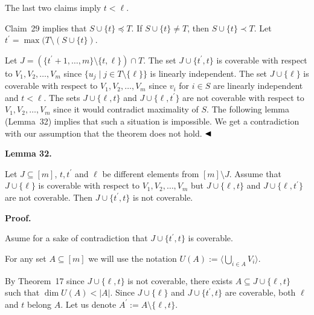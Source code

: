 \documentclass[10pt,a4paper]{article}
\begin{document}
The last two claims imply $t<\ell$.\par



Claim 29 implies that $S\cup\{t\}\preceq T$. If $S\cup\{t\}\neq T$, then $S\cup\{t\}\prec T$.
Let $t^{\prime}=\max(T\setminus(S\cup\{t\})$.\par



Let $J=(\{t^{\prime}+1,\dots,m\}\setminus\{t,\ell\})\cap T$.
The set $J\cup\{t^{\prime},t\}$ is coverable with respect to $V_{1},V_{2},\dots,V_{m}$ since $\{u_{j}\mid j\in T\setminus\{\ell\}\}$ is linearly independent.
The set $J\cup\{\ell\}$ is coverable with respect to $V_{1},V_{2},\dots,V_{m}$ since $v_{i}$ for $i\in S$ are linearly independent and $t<\ell$.
The sets $J\cup\{\ell,t\}$ and $J\cup\{\ell,t^{\prime}\}$ are not coverable with respect to $V_{1},V_{2},\dots,V_{m}$ since it would contradict maximality of $S$. The following lemma (Lemma 32) implies that such a situation is impossible. We get a contradiction with our assumption that the theorem does not hold.
$\hfill\blacktriangleleft$\par



\par\medskip\noindent\textbf{
Lemma 32.
}\par



Let $J\subseteq[m]$, $t,t^{\prime}$ and $\ell$ be different elements from $[m]\setminus J$.
Assume that $J\cup\{\ell\}$ is coverable with respect to $V_{1},V_{2},\dots,V_{m}$ but $J\cup\{\ell,t\}$ and $J\cup\{\ell,t^{\prime}\}$ are not coverable. Then $J\cup\{t^{\prime},t\}$ is not coverable.\par



\par\medskip\noindent\textbf{Proof.}\par


Asume for a sake of contradiction that $J\cup\{t^{\prime},t\}$ is coverable.\par



For any set $A\subseteq[m]$ we will use the notation $U(A):=\langle\bigcup_{i\in A}V_{i}\rangle$.\par



By Theorem 17 since $J\cup\{\ell,t\}$ is not coverable, there exists $A\subseteq J\cup\{\ell,t\}$ such that $\dim U(A)<|A|$.
Since $J\cup\{\ell\}$ and $J\cup\{t^{\prime},t\}$ are coverable, both $\ell$ and $t$ belong $A$.
Let us denote $A^{\prime}:=A\setminus\{\ell,t\}$.\par
\end{document}
